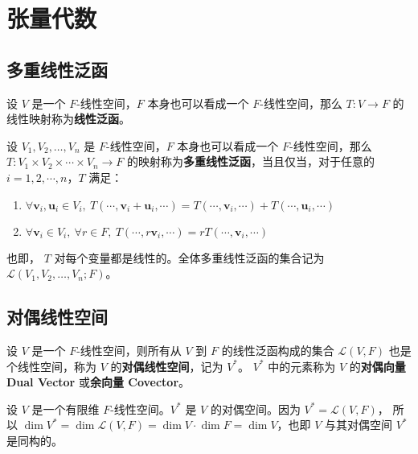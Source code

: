 \section{张量代数}

\subsection{多重线性泛函}

\begin{definition}
    设 $V$ 是一个 $F$-线性空间，$F$ 本身也可以看成一个 $F$-线性空间，那么 $T:V\to F$ 的线性映射称为\textbf{线性泛函}。
    \label{def:linear_functional}
\end{definition}

\begin{definition}
    设 $V_1,V_2,\ldots,V_n$ 是 $F$-线性空间，$F$ 本身也可以看成一个 $F$-线性空间，那么 $T:V_1\times V_2\times \cdots \times V_n \to F$ 的映射称为\textbf{多重线性泛函}，当且仅当，对于任意的 $i = 1,2,\cdots,n$，$T$ 满足：
    \begin{enumerate}
        \item $\forall \mathbf{v}_i,\mathbf{u}_i \in V_i,\ T(\cdots,\mathbf{v}_i+\mathbf{u}_i,\cdots) = T(\cdots,\mathbf{v}_i,\cdots)+T(\cdots,\mathbf{u}_i,\cdots)$
        \item $\forall \mathbf{v}_i \in V_i,\ \forall r\in F,\ T(\cdots,r\mathbf{v}_i,\cdots) = rT(\cdots,\mathbf{v}_i,\cdots)$
    \end{enumerate}
    也即， $T$ 对每个变量都是线性的。全体多重线性泛函的集合记为 $\mathcal{L}(V_1,V_2,\ldots,V_n;F)$。
    \label{def:multilinear_functional}
\end{definition}

\subsection{对偶线性空间}

\begin{definition}
    设 $V$ 是一个 $F$-线性空间，则所有从 $V$ 到 $F$ 的线性泛函构成的集合 $\mathcal{L}(V,F)$ 也是个线性空间，称为 $V$ 的\textbf{对偶线性空间}，记为 $V^*$。
    $V^*$ 中的元素称为 $V$ 的\textbf{对偶向量 Dual Vector} 或\textbf{余向量 Covector}。 
    \label{def:dual_linear_space}
\end{definition}

\begin{proposition}
    设 $V$ 是一个有限维 $F$-线性空间。$V^*$ 是 $V$ 的对偶空间。因为 $V^* = \mathcal{L}(V,F)$，
    所以 $\dim V^* = \dim \mathcal{L}(V,F) = \dim V \cdot \dim F = \dim V$，也即 $V$ 与其对偶空间 $V^*$ 是同构的。
\end{proposition}

